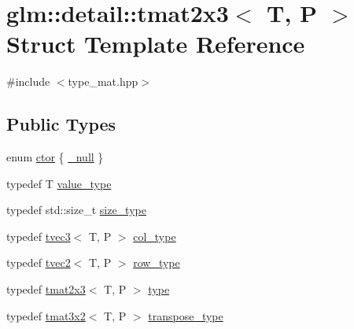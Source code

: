 \hypertarget{structglm_1_1detail_1_1tmat2x3}{}\section{glm\+:\+:detail\+:\+:tmat2x3$<$ T, P $>$ Struct Template Reference}
\label{structglm_1_1detail_1_1tmat2x3}


{\ttfamily \#include $<$type\+\_\+mat.\+hpp$>$}

\subsection*{Public Types}
\begin{DoxyCompactItemize}
\item 
enum \hyperlink{structglm_1_1detail_1_1tmat2x3_ad7092896f5d4dad36473ed142687f571}{ctor} \{ \hyperlink{structglm_1_1detail_1_1tmat2x3_ad7092896f5d4dad36473ed142687f571adcd0a5de46b55f16016e91c37678b70c}{\+\_\+null}
 \}
\item 
typedef T \hyperlink{structglm_1_1detail_1_1tmat2x3_a956bc7b781faea2cf8a47f9150e035f4}{value\+\_\+type}
\item 
typedef std\+::size\+\_\+t \hyperlink{structglm_1_1detail_1_1tmat2x3_ab27aa4557eb2ffaf9931bcee48823cde}{size\+\_\+type}
\item 
typedef \hyperlink{structglm_1_1detail_1_1tvec3}{tvec3}$<$ T, P $>$ \hyperlink{structglm_1_1detail_1_1tmat2x3_aa68634b0c048f0010844a45aa5e9bdab}{col\+\_\+type}
\item 
typedef \hyperlink{structglm_1_1detail_1_1tvec2}{tvec2}$<$ T, P $>$ \hyperlink{structglm_1_1detail_1_1tmat2x3_ae86cbe307097a27d0d6965b41e8f7ae3}{row\+\_\+type}
\item 
typedef \hyperlink{structglm_1_1detail_1_1tmat2x3}{tmat2x3}$<$ T, P $>$ \hyperlink{structglm_1_1detail_1_1tmat2x3_ac22545a54f77e4e0915042109672179f}{type}
\item 
typedef \hyperlink{structglm_1_1detail_1_1tmat3x2}{tmat3x2}$<$ T, P $>$ \hyperlink{structglm_1_1detail_1_1tmat2x3_aba2a62afb75e30c53886be45955591ae}{transpose\+\_\+type}
\end{DoxyCompactItemize}
